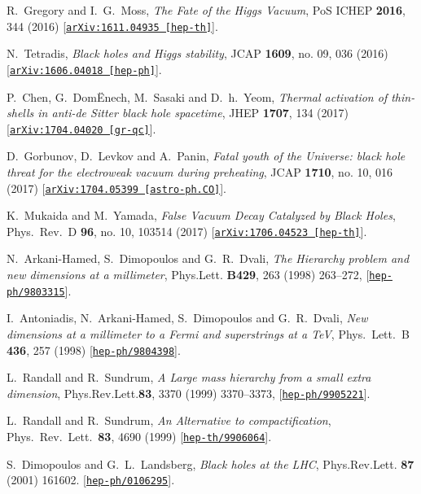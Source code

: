\documentclass[aps,12pt,prd,superscriptaddress,preprintnumbers, 
	amssymb,
	amsmath,
	notitlepage,
	longbibliography,
	nofootinbib]{revtex4-1}
\begin{document}
\begin{thebibliography}{10}
R.~Gregory and I.~G.~Moss,
{\it The Fate of the Higgs Vacuum},
PoS ICHEP {\bf 2016}, 344 (2016)
[\href{http://xxx.lanl.gov/abs/1611.04935}{{\tt arXiv:1611.04935 [hep-th]}}].

N.~Tetradis,
{\it Black holes and Higgs stability},
JCAP {\bf 1609}, no. 09, 036 (2016)
[\href{http://xxx.lanl.gov/abs/1606.04018}{{\tt arXiv:1606.04018 [hep-ph]}}].

P.~Chen, G.~Dom\"Enech, M.~Sasaki and D.~h.~Yeom,
{\it Thermal activation of thin-shells in anti-de Sitter black hole spacetime},
JHEP {\bf 1707}, 134 (2017)
[\href{http://xxx.lanl.gov/abs/1704.04020}{{\tt arXiv:1704.04020 [gr-qc]}}].

D.~Gorbunov, D.~Levkov and A.~Panin,
{\it Fatal youth of the Universe: black hole threat for the electroweak 
vacuum during preheating},
JCAP {\bf 1710}, no. 10, 016 (2017)
[\href{http://xxx.lanl.gov/abs/1704.05399}{{\tt arXiv:1704.05399 [astro-ph.CO]}}].

K.~Mukaida and M.~Yamada,
{\it False Vacuum Decay Catalyzed by Black Holes},
Phys.\ Rev.\ D {\bf 96}, no. 10, 103514 (2017)
[\href{http://xxx.lanl.gov/abs/1706.04523}{{\tt arXiv:1706.04523 [hep-th]}}].

N.~Arkani-Hamed, S.~Dimopoulos and G.~R.~Dvali,
{\it The Hierarchy problem and new dimensions at a millimeter},
Phys.Lett. {\bf B429}, 263 (1998) 263--272,
[\href{http://xxx.lanl.gov/abs/hep-ph/9803315}{{\tt hep-ph/9803315}}].

I.~Antoniadis, N.~Arkani-Hamed, S.~Dimopoulos and G.~R.~Dvali,
{\it New dimensions at a millimeter to a Fermi and superstrings at a TeV},
Phys.\ Lett.\ B {\bf 436}, 257 (1998)
[\href{http://xxx.lanl.gov/abs/hep-ph/9804398}{{\tt hep-ph/9804398}}].

L.~Randall and R.~Sundrum,
{\it A Large mass hierarchy from a small extra dimension},
Phys.Rev.Lett.{\bf 83}, 3370 (1999) 3370--3373,
[\href{http://xxx.lanl.gov/abs/hep-ph/9905221}{{\tt hep-ph/9905221}}].

L.~Randall and R.~Sundrum,
{\it An Alternative to compactification},
Phys.\ Rev.\ Lett.\  {\bf 83}, 4690 (1999)
[\href{http://xxx.lanl.gov/abs/hep-th/9906064}{{\tt hep-th/9906064}}].

S.~Dimopoulos and G.~L.~Landsberg,
{\it {Black holes at the LHC}},  
Phys.Rev.Lett. {\bf 87} (2001) 161602.
[\href{http://xxx.lanl.gov/abs/hep-ph/0106295}{{\tt hep-ph/0106295}}].


\end{thebibliography}
\end{document}
